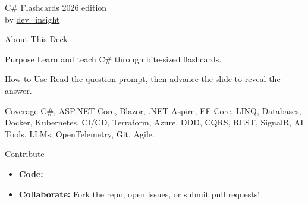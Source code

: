 \documentclass{mybeamer}
\begin{document}
\begin{frame}
  \centering
  {\Huge C\# Flashcards 2026 edition}\\[0.5em]
  {\large by \href{https://github.com/konradcinkusz}{\faGithub\;dev\_insight}}
\end{frame}

\begin{frame}{About This Deck}

  \begin{block}{\faBullseye\quad Purpose}
    Learn and teach C\# through bite-sized flashcards.
  \end{block}

  \begin{block}{\faPlay\quad How to Use}
    Read the question prompt, then advance the slide to reveal the answer.
  \end{block}

  \begin{block}{\faList\quad Coverage}
    C\#, ASP.NET Core, Blazor, .NET Aspire, EF Core, LINQ, Databases, Docker, Kubernetes, CI/CD, Terraform, Azure, DDD, CQRS, REST, SignalR, AI Tools, LLMs, OpenTelemetry, Git, Agile.
  \end{block}

   {
       \begin{block}{\faUsers\quad Contribute}
         \begin{itemize}
           \item \textbf{Code:} \href{\RepoURL}{\color{blue!80!black}\faGithub\;\underline{\RepoName}}
           \item \textbf{Collaborate:} Fork the repo, open issues, or submit pull requests!
         \end{itemize}
       \end{block}
   }
\end{frame}
\end{document}
